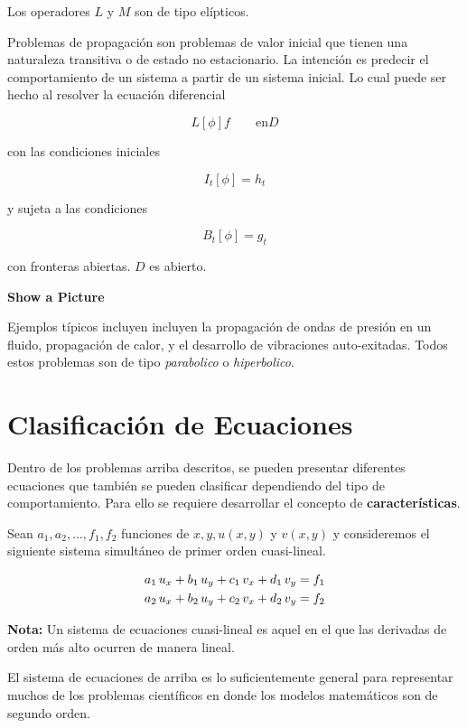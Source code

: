 Los operadores $L$ y $M$ son de tipo elípticos.

Problemas de propagación son problemas de valor inicial que tienen una naturaleza transitiva o de estado no estacionario. La intención es predecir el comportamiento de un sistema a partir de un sistema inicial. Lo cual puede ser hecho al resolver la ecuación diferencial

\[ L[\phi] f \qquad \text{en} D \]

con las condiciones iniciales

\[ I_t[\phi] = h_t \]

y sujeta a las condiciones

\[ B_t[\phi] = g_t \]

con fronteras abiertas. $D$ es abierto. 

\textbf{Show a Picture}

Ejemplos típicos incluyen incluyen la propagación de ondas de presión en un fluido, propagación de calor, y el desarrollo de vibraciones auto-exitadas. Todos estos problemas son de tipo \textit{parabolico} o \textit{hiperbolico}.

\section{Clasificación de Ecuaciones}

Dentro de los problemas arriba descritos, se pueden presentar diferentes ecuaciones que también se pueden clasificar dependiendo del tipo de comportamiento. Para ello se requiere desarrollar el concepto de \textbf{características}.

Sean $a_1, a_2, \dots, f_1, f_2$ funciones de $x,y, u(x,y)$ y $v(x,y)$ y consideremos el siguiente sistema simultáneo de primer orden cuasi-lineal.

\begin{align*}
a_1 \thinspace u_x + b_1 \thinspace u_y + c_1 \thinspace v_x + d_1 \thinspace v_y &= f_1 \\
a_2 \thinspace u_x + b_2 \thinspace u_y + c_2 \thinspace v_x + d_2 \thinspace v_y &= f_2
\end{align*}

\textbf{Nota:} Un sistema de ecuaciones cuasi-lineal es aquel en el que las derivadas de orden más alto ocurren de manera lineal.

El sistema de ecuaciones de arriba es lo suficientemente general para representar muchos de los problemas científicos en donde los modelos matemáticos son de segundo orden.

